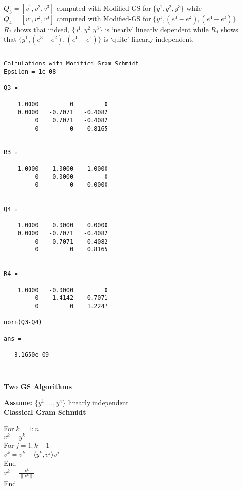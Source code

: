 \documentclass[letterpaper]{article}
\begin{document}
\newpage  
$Q_3=[v^1, v^2, v^3]$ computed with Modified-GS for $\{y^1,y^2,y^3\}$ while $Q_4=[v^1, v^2, v^3]$ computed with Modified-GS for $\{y^1,(e^3-e^2),(e^4-e^3)\}$. $R_3$ shows that indeed, $\{y^1,y^2,y^3\}$ is `nearly' linearly dependent while $R_4$ shows that $\{y^1,(e^3-e^2),(e^4-e^3)\}$ is `quite' linearly independent.

    \begin{verbatim}

Calculations with Modified Gram Schmidt
Epsilon = 1e-08

Q3 =

    1.0000         0         0
    0.0000   -0.7071   -0.4082
         0    0.7071   -0.4082
         0         0    0.8165


R3 =

    1.0000    1.0000    1.0000
         0    0.0000         0
         0         0    0.0000


Q4 =

    1.0000    0.0000    0.0000
    0.0000   -0.7071   -0.4082
         0    0.7071   -0.4082
         0         0    0.8165


R4 =

    1.0000   -0.0000         0
         0    1.4142   -0.7071
         0         0    1.2247

norm(Q3-Q4)

ans =

   8.1650e-09



\end{verbatim}


\newpage

\Large

\begin{center}
 \textbf{ \Huge Two GS Algorithms}
 \end{center}

\noindent \textbf{Assume:} $\{y^1, \ldots, y^n\}$ linearly independent \\

\noindent \textbf{Classical Gram Schmidt}

        For $k=1:n$\\
        \indent\hspace{4ex}$v^k=y^k$\\
        \indent\hspace{4ex}For $j=1:k-1$\\
        \indent\hspace{8ex}$v^k=v^k-\langle y^k,v^j\rangle v^j$\\
        \indent\hspace{4ex}End\\
        \indent\hspace{4ex}$v^k =\frac{v^k}{\|v^k\|}$\\
        End\\
\end{document}

